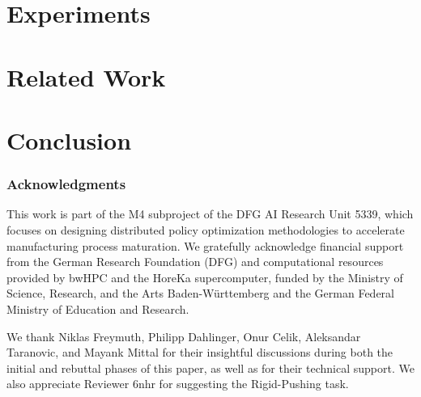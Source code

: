 \documentclass{article} %
\begin{document}
\section{Experiments}


\section{Related Work}


\section{Conclusion}


\subsubsection*{Acknowledgments}
This work is part of the M4 subproject of the DFG AI Research Unit 5339, which focuses on designing distributed policy optimization methodologies to accelerate manufacturing process maturation. We gratefully acknowledge financial support from the German Research Foundation (DFG) and computational resources provided by bwHPC and the HoreKa supercomputer, funded by the Ministry of Science, Research, and the Arts Baden-Württemberg and the German Federal Ministry of Education and Research.

We thank Niklas Freymuth, Philipp Dahlinger, Onur Celik, Aleksandar Taranovic, and Mayank Mittal for their insightful discussions during both the initial and rebuttal phases of this paper, as well as for their technical support. We also appreciate Reviewer 6nhr for suggesting the Rigid-Pushing task.




\newpage
\appendix

\end{document}
